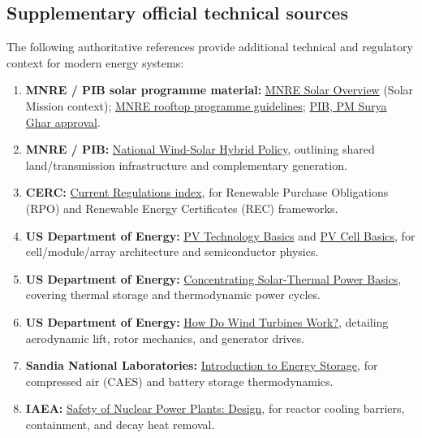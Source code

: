\documentclass[11pt,a4paper]{article}
\begin{document}
\subsection{Supplementary official technical sources}
The following authoritative references provide additional technical and regulatory context for modern energy systems:
\begin{enumerate}[label=\textbf{R\arabic*.},leftmargin=2.5em]
\item \textbf{MNRE / PIB solar programme material:} \href{https://mnre.gov.in/en/solar-overview/}{MNRE Solar Overview} (Solar Mission context); \href{https://mnre.gov.in/en/grid-connected-solar-rooftop-programme/}{MNRE rooftop programme guidelines}; \href{https://www.pib.gov.in/PressReleasePage.aspx?PRID=2010133&lang=1&reg=1}{PIB, PM Surya Ghar approval}.
\item \textbf{MNRE / PIB:} \href{https://www.pib.gov.in/PressReleaseIframePage.aspx?PRID=1532073}{National Wind-Solar Hybrid Policy}, outlining shared land/transmission infrastructure and complementary generation.
\item \textbf{CERC:} \href{https://cercind.gov.in/current_reg.html}{Current Regulations index}, for Renewable Purchase Obligations (RPO) and Renewable Energy Certificates (REC) frameworks.
\item \textbf{US Department of Energy:} \href{https://www.energy.gov/cmei/systems/solar-photovoltaic-technology-basics}{PV Technology Basics} and \href{https://www.energy.gov/cmei/systems/solar-photovoltaic-cell-basics}{PV Cell Basics}, for cell/module/array architecture and semiconductor physics.
\item \textbf{US Department of Energy:} \href{https://www.energy.gov/cmei/systems/concentrating-solar-thermal-power-basics}{Concentrating Solar-Thermal Power Basics}, covering thermal storage and thermodynamic power cycles.
\item \textbf{US Department of Energy:} \href{https://www.energy.gov/cmei/systems/how-do-wind-turbines-work}{How Do Wind Turbines Work?}, detailing aerodynamic lift, rotor mechanics, and generator drives.
\item \textbf{Sandia National Laboratories:} \href{https://energy.sandia.gov/wp-content/uploads/2024/01/Hawaii-PUC-Jan-10th-2024-SNL-crk.pdf}{Introduction to Energy Storage}, for compressed air (CAES) and battery storage thermodynamics.
\item \textbf{IAEA:} \href{https://nucleus.iaea.org/sites/nss-oui/Published%20Collections/m_daad92bb-3bb0-4445-a6ec-a287e55e9664/m_daad92bb-3bb0-4445-a6ec-a287e55e9664__65_0.Html}{Safety of Nuclear Power Plants: Design}, for reactor cooling barriers, containment, and decay heat removal.

\end{enumerate}
\end{document}
